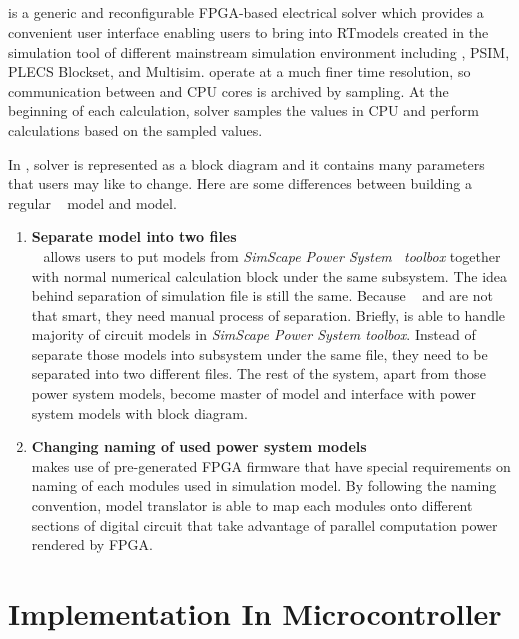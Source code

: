 \subsection{\ehs}
\ehs is a generic and reconfigurable FPGA-based electrical solver which provides a convenient user interface enabling users to bring into \gls{RT}models created in the simulation tool of different mainstream simulation environment including \simulink, PSIM, PLECS Blockset, and Multisim. \ehs operate at a much finer time resolution, so communication between \ehs and \gls{CPU} cores is archived by sampling. At the beginning of each calculation, \ehs solver samples the values in \gls{CPU} and perform calculations based on the sampled values. 

In \simulink, \ehs solver is represented as a block diagram and it contains many parameters that users may like to change. Here are some differences between building a regular \rtlab~ model and \ehs model.
\begin{enumerate}
\item \textbf{Separate model into two files} \\
\rtlab~ allows users to put models from \textit{SimScape Power System \simulink~toolbox} together with normal numerical calculation block under the same subsystem. The idea behind separation of simulation file is still the same. Because \rtlab~ and \ehs are not that smart, they need manual process of separation. Briefly, \ehs is able to handle majority of circuit models in \textit{SimScape Power System toolbox}. Instead of separate those models into subsystem under the same file, they need to be separated into two different files.  The rest of the system, apart from those power system models, become master of model and interface with power system models with \ehs block diagram. 
\item \textbf{Changing naming of used power system models} \\
\ehs makes use of pre-generated \gls{FPGA} firmware that have special requirements on naming of each modules used in simulation model. By following the naming convention, model translator is able to map each modules onto different sections of digital circuit that take advantage of parallel computation power rendered by \gls{FPGA}. 
\end{enumerate}
\section{Implementation In Microcontroller}\label{sec:implement_micro}

